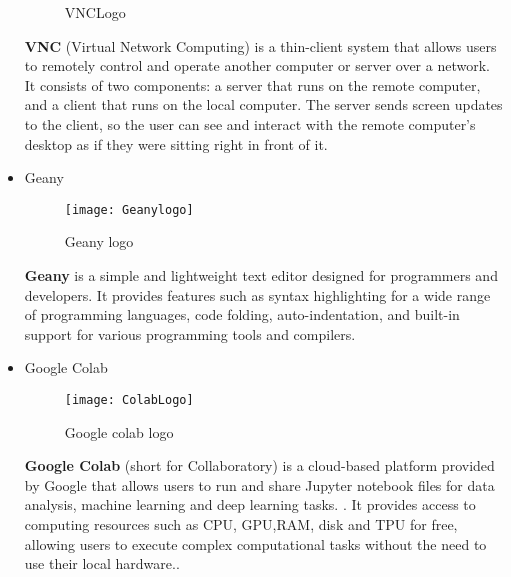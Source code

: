 \begin{itemize}
\begin{figure}[h]
        \caption{VNCLogo}
        \label{fig:VNCLogo}
    \end{figure}
\FloatBarrier
\subitem\textbf{VNC } (Virtual Network Computing) is a thin-client system that allows users to remotely control and operate another computer or server over a network. It consists of two components: a server that runs on the remote computer, and a client that runs on the local computer.\cite{RVND}
\subitem  The server sends screen updates to the client, so the user can see and interact with the remote computer's desktop as if they were sitting right in front of it.\cite{RVND}
  \item Geany
\begin{figure}[h]
         \centering
        \texttt{[image: Geanylogo]}
   
        \caption{Geany logo}
        \label{fig:Geanylogo}
    \end{figure}
\FloatBarrier
\subitem\textbf{Geany} is a simple and lightweight text editor designed for programmers and developers. It provides features such as syntax highlighting for a wide range of programming languages, code folding, auto-indentation, and built-in support for various programming tools and compilers.\cite{GND}
  \item Google Colab
\begin{figure}[h]
         \centering
        \texttt{[image: ColabLogo]}
   
        \caption{Google colab logo}
        \label{fig: Google Colab logo}
    \end{figure}
\FloatBarrier
\subitem\textbf{Google Colab} (short for Collaboratory) is a cloud-based platform provided by Google that allows users to run and share Jupyter notebook files for data analysis, machine learning and deep learning tasks. .\cite{GRND}
\subitem It provides access to computing resources such as CPU, GPU,RAM, disk and TPU for free, allowing users to execute complex computational tasks without the need to use their local hardware..\cite{GRND}
\end{itemize}
